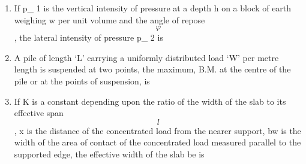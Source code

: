 \documentclass[11pt,a4paper]{article}
\begin{document}
\begin{enumerate}
{}
\\
\item{If p\_ 1 is the vertical intensity of pressure at a depth h on a block of earth weighing w per unit volume and the angle of repose $$\varphi $$, the lateral intensity of pressure p\_ 2 is
}
\\
\item{A pile of length `L' carrying a uniformly distributed load `W' per metre length is suspended at two points, the maximum, B.M. at the centre of the pile or at the points of suspension, is
}
\\
\item{If K is a constant depending upon the ratio of the width of the slab to its effective span $$l$$, x is the distance of the concentrated load from the nearer support, bw is the width of the area of contact of the concentrated load measured parallel to the supported edge, the effective width of the slab be is}

\end{enumerate}
\end{document}
